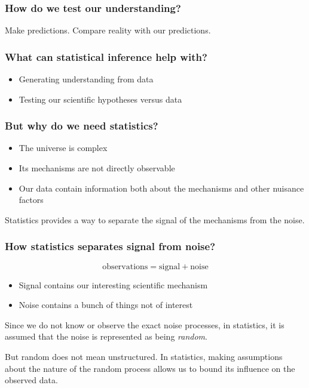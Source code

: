 \documentclass[handout]{beamer}
\begin{document}
\begin{frame}
	\frametitle{How do we test our understanding?}
	
	Make predictions. Compare reality with our predictions.

\end{frame}

\begin{frame}
	\frametitle{What can statistical inference help with?}
	
	\begin{itemize}
		\item Generating understanding from data
		\item Testing our scientific hypotheses versus data
	\end{itemize}
	
\end{frame}

\begin{frame}
	\frametitle{But why do we need statistics?}
	
	\begin{itemize}
		\item The universe is complex
		\item Its mechanisms are not directly observable
		\item Our data contain information both about the mechanisms and other nuisance factors
	\end{itemize}
	
	Statistics provides a way to separate the signal of the mechanisms from the noise.
	
\end{frame}

\begin{frame}
	\frametitle{How statistics separates signal from noise?}
	
	\begin{equation}
	\text{observations} = \text{signal} + \text{noise}
	\end{equation}
	
	\begin{itemize}
		\item Signal contains our interesting scientific mechanism
		\item Noise contains a bunch of things not of interest
	\end{itemize}
	
	Since we do not know or observe the exact noise processes, in statistics, it is assumed that the noise is represented as being \textit{random}.
	
	\vspace{0.5cm}
	
	But random does not mean unstructured. In statistics, making assumptions about the nature of the random process allows us to bound its influence on the observed data.
	
\end{frame}
\end{document}
